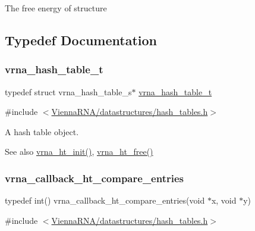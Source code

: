 The free energy of {\ttfamily structure} 

\subsection{Typedef Documentation}
\mbox{\label{group__hash__table__utils_gabc7c6f41b718c8e23929e528891a89c4}} 
\subsubsection{\texorpdfstring{vrna\_hash\_table\_t}{vrna\_hash\_table\_t}}
{\footnotesize\ttfamily typedef struct vrna\+\_\+hash\+\_\+table\+\_\+s$\ast$ \mbox{\hyperlink{group__hash__table__utils_gabc7c6f41b718c8e23929e528891a89c4}{vrna\+\_\+hash\+\_\+table\+\_\+t}}}



{\ttfamily \#include $<$\mbox{\hyperlink{hash__tables_8h}{Vienna\+R\+N\+A/datastructures/hash\+\_\+tables.\+h}}$>$}



A hash table object. 

\begin{DoxySeeAlso}{See also}
\mbox{\hyperlink{group__hash__table__utils_ga37d1c7e13087a2b7c1b87fda34577c29}{vrna\+\_\+ht\+\_\+init()}}, \mbox{\hyperlink{group__hash__table__utils_ga479db024c70437aa2576d60b373c5262}{vrna\+\_\+ht\+\_\+free()}} 
\end{DoxySeeAlso}
\mbox{\label{group__hash__table__utils_gace4adf608f9dc246f66f6264d30c0f8d}} 
\subsubsection{\texorpdfstring{vrna\_callback\_ht\_compare\_entries}{vrna\_callback\_ht\_compare\_entries}}
{\footnotesize\ttfamily typedef int() vrna\+\_\+callback\+\_\+ht\+\_\+compare\+\_\+entries(void $\ast$x, void $\ast$y)}



{\ttfamily \#include $<$\mbox{\hyperlink{hash__tables_8h}{Vienna\+R\+N\+A/datastructures/hash\+\_\+tables.\+h}}$>$}



